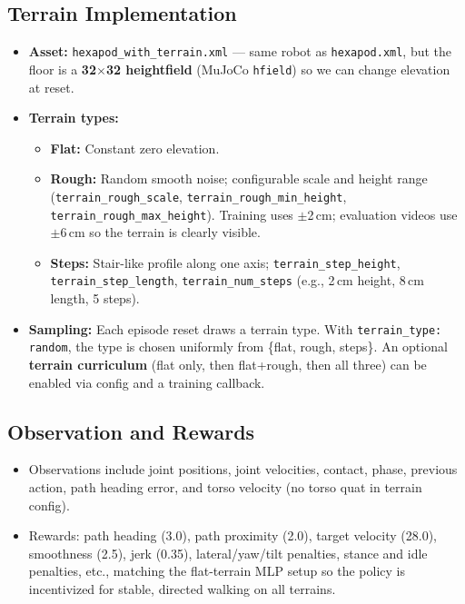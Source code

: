 \documentclass[11pt]{article}
\begin{document}
\subsection{Terrain Implementation}

\begin{itemize}
  \item \textbf{Asset:} \texttt{hexapod\_with\_terrain.xml} --- same robot as \texttt{hexapod.xml}, but the floor is a \textbf{32$\times$32 heightfield} (MuJoCo \texttt{hfield}) so we can change elevation at reset.
  \item \textbf{Terrain types:}
  \begin{itemize}
    \item \textbf{Flat:} Constant zero elevation.
    \item \textbf{Rough:} Random smooth noise; configurable scale and height range (\texttt{terrain\_rough\_scale}, \texttt{terrain\_rough\_min\_height}, \texttt{terrain\_rough\_max\_height}). Training uses $\pm$2\,cm; evaluation videos use $\pm$6\,cm so the terrain is clearly visible.
    \item \textbf{Steps:} Stair-like profile along one axis; \texttt{terrain\_step\_height}, \texttt{terrain\_step\_length}, \texttt{terrain\_num\_steps} (e.g., 2\,cm height, 8\,cm length, 5 steps).
  \end{itemize}
  \item \textbf{Sampling:} Each episode reset draws a terrain type. With \texttt{terrain\_type: random}, the type is chosen uniformly from \{flat, rough, steps\}. An optional \textbf{terrain curriculum} (flat only, then flat+rough, then all three) can be enabled via config and a training callback.
\end{itemize}

\subsection{Observation and Rewards}

\begin{itemize}
  \item Observations include joint positions, joint velocities, contact, phase, previous action, path heading error, and torso velocity (no torso quat in terrain config).
  \item Rewards: path heading (3.0), path proximity (2.0), target velocity (28.0), smoothness (2.5), jerk (0.35), lateral/yaw/tilt penalties, stance and idle penalties, etc., matching the flat-terrain MLP setup so the policy is incentivized for stable, directed walking on all terrains.
\end{itemize}
\end{document}
